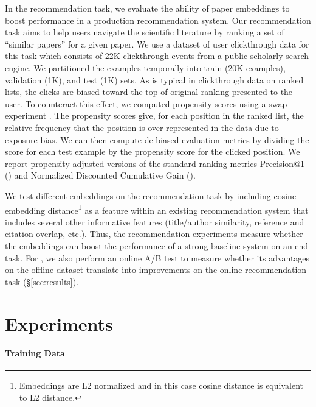 In the recommendation task, we evaluate the ability of paper embeddings to boost performance in a production recommendation system.  Our recommendation task aims to help users navigate the scientific literature by ranking a set of ``similar papers'' for a given paper.  
We use a dataset of user clickthrough data for this task which consists of 22K clickthrough events from a public scholarly search engine. We partitioned the examples temporally into train (20K examples), validation (1K), and test (1K) sets.  As is typical in clickthrough data on ranked lists, the clicks are biased toward the top of original ranking presented to the user.  To counteract this effect, we computed propensity scores using a swap experiment \cite{Agarwal2019EstimatingPB}.  The propensity scores give, for each position in the ranked list, the relative frequency that the position is over-represented in the data due to exposure bias.  We can then compute de-biased evaluation metrics by dividing the score for each test example by the propensity score for the clicked position.  We report propensity-adjusted  versions of the standard ranking metrics Precision@1 () and Normalized Discounted Cumulative Gain ().

We test different embeddings on the recommendation task by including cosine embedding distance\footnote{Embeddings are L2 normalized and in this case cosine distance is equivalent to L2 distance.} as a feature within an existing recommendation system that includes several other informative features (title/author similarity, reference and citation overlap, etc.). Thus, the recommendation experiments measure whether the embeddings can boost the performance of a strong baseline system on an end task.  For \sys , we also perform an online A/B test to measure whether its advantages on the offline dataset translate into improvements on the online recommendation task (\S\ref{sec:results}).

\section{Experiments}
\label{sec:exp-details}

\setlength{\dashlinedash}{0.2pt}
\setlength{\dashlinegap}{1pt}
\setlength{\arrayrulewidth}{0.4pt}

\paragraph{Training Data}

